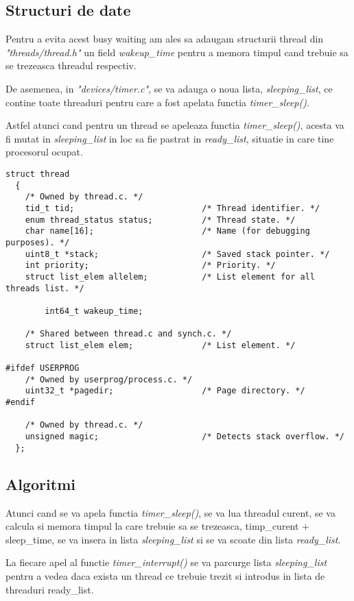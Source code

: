 \documentclass[a4paper,12pt]{report}
\begin{document}
\subsection{Structuri de date}
Pentru a evita acest busy waiting am ales sa adaugam structurii thread din \textit{"threads/thread.h"} un field
\textit{wakeup\_time} pentru a memora timpul cand trebuie sa se trezeasca threadul respectiv.

De asemenea, in \textit{"devices/timer.c"}, se va adauga o noua lista, \textit{sleeping\_list}, ce contine toate threaduri
pentru care a fost apelata functia \textit{timer\_sleep()}.

Astfel atunci cand pentru un thread se apeleaza functia \textit{timer\_sleep()}, acesta va fi mutat in 
\textit{sleeping\_list} in loc sa fie pastrat in \textit{ready\_list}, situatie in care tine procesorul ocupat.

\begin{lstlisting}
struct thread
  {
    /* Owned by thread.c. */
    tid_t tid;                          /* Thread identifier. */
    enum thread_status status;          /* Thread state. */
    char name[16];                      /* Name (for debugging purposes). */
    uint8_t *stack;                     /* Saved stack pointer. */
    int priority;                       /* Priority. */
    struct list_elem allelem;           /* List element for all threads list. */

		int64_t wakeup_time;

    /* Shared between thread.c and synch.c. */
    struct list_elem elem;              /* List element. */

#ifdef USERPROG
    /* Owned by userprog/process.c. */
    uint32_t *pagedir;                  /* Page directory. */
#endif

    /* Owned by thread.c. */
    unsigned magic;                     /* Detects stack overflow. */
  };
\end{lstlisting}

\subsection{Algoritmi}
  Atunci cand se va apela functia \textit{timer\_sleep()}, se va lua threadul curent, se va calcula si memora timpul
la care trebuie sa se trezeasca, timp\_curent + sleep\_time, se va insera in lista \textit{sleeping\_list} si se va 
scoate din lista \textit{ready\_list}.

La fiecare apel al functie \textit{timer\_interrupt()} se va parcurge lista \textit{sleeping\_list} pentru a vedea daca
exista un thread ce trebuie trezit si introdus in lista de threaduri {ready\_list}.
\end{document}
